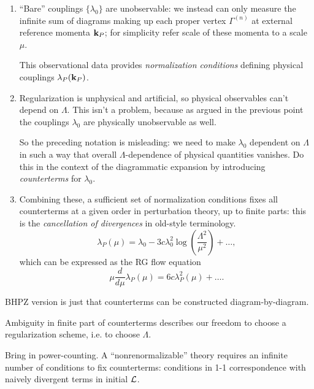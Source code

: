 \documentclass[notitlepage,openany,11pt]{report}
\theoremstyle{plain}%
\numberwithin{equation}{section}
\begin{document}
\begin{enumerate}
\item ``Bare'' couplings $\{\lambda_{0}\}$ are unobservable: we instead can only measure the infinite sum of diagrams making up each proper vertex $\Gamma^{(n)}$ at external reference momenta $\mathbf{k}_{P}$; for simplicity refer scale of these momenta to a scale $\mu$. 

This observational data provides \textit{normalization conditions} defining physical couplings $\lambda_{P} (\mathbf{k}_{P})$.


\item Regularization is unphysical and artificial, so physical observables can't depend on $\Lambda$. This isn't a problem, because as argued in the previous point the couplings $\lambda_{0}$ are physically unobservable as well. 

So the preceding notation is misleading: we need to make $\lambda_{0}$ dependent on $\Lambda$ in such a way that overall $\Lambda$-dependence of physical quantities vanishes. Do this in the context of the diagrammatic expansion by introducing \textit{counterterms} for $\lambda_{0}$.


\item Combining these, a sufficient set of normalization conditions fixes all counterterms at a given order in perturbation theory, up to finite parts: this is the \textit{cancellation of divergences} in old-style terminology. 
\begin{equation}
\lambda_{P}(\mu) = \lambda_{0} - 3c \lambda_{0}^{2} \log\left( \frac{\Lambda^2}{\mu^2} \right) + \ldots,
\end{equation}
which can be expressed as the RG flow equation 
\begin{equation}
\mu \frac{d}{d\mu}\lambda_{P}(\mu) =6c \lambda_{P}^{2}(\mu) + \ldots.
\end{equation}

\end{enumerate}



BHPZ version is just that counterterms can be constructed diagram-by-diagram. 

Ambiguity in finite part of counterterms describes our freedom to choose a regularization scheme, i.e. to choose $\Lambda$.

Bring in power-counting. A ``nonrenormalizable'' theory requires an infinite number of conditions to fix counterterms: conditions in 1-1 correspondence with naively divergent terms in initial $\mathcal{L}$.
\end{document}
